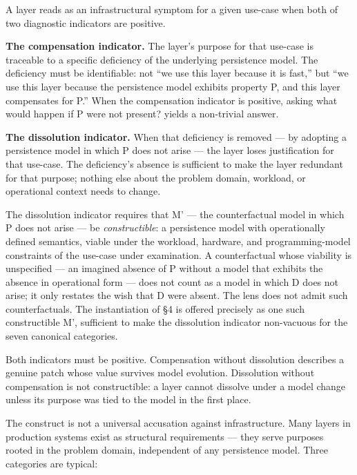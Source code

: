 \documentclass[
]{article}
\begin{document}
A layer reads as an infrastructural symptom for a given use-case when
both of two diagnostic indicators are positive.

\textbf{The compensation indicator.} The layer's purpose for that
use-case is traceable to a specific deficiency of the underlying
persistence model. The deficiency must be identifiable: not ``we use
this layer because it is fast,'' but ``we use this layer because the
persistence model exhibits property P, and this layer compensates for
P.'' When the compensation indicator is positive, asking what would
happen if P were not present? yields a non-trivial answer.

\textbf{The dissolution indicator.} When that deficiency is removed ---
by adopting a persistence model in which P does not arise --- the layer
loses justification for that use-case. The deficiency's absence is
sufficient to make the layer redundant for that purpose; nothing else
about the problem domain, workload, or operational context needs to
change.

The dissolution indicator requires that M' --- the counterfactual model
in which P does not arise --- be \emph{constructible}: a persistence
model with operationally defined semantics, viable under the workload,
hardware, and programming-model constraints of the use-case under
examination. A counterfactual whose viability is unspecified --- an
imagined absence of P without a model that exhibits the absence in
operational form --- does not count as a model in which D does not
arise; it only restates the wish that D were absent. The lens does not
admit such counterfactuals. The instantiation of §4 is offered precisely
as one such constructible M', sufficient to make the dissolution
indicator non-vacuous for the seven canonical categories.

Both indicators must be positive. Compensation without dissolution
describes a genuine patch whose value survives model evolution.
Dissolution without compensation is not constructible: a layer cannot
dissolve under a model change unless its purpose was tied to the model
in the first place.

The construct is not a universal accusation against infrastructure. Many
layers in production systems exist as structural requirements --- they
serve purposes rooted in the problem domain, independent of any
persistence model. Three categories are typical:
\end{document}
